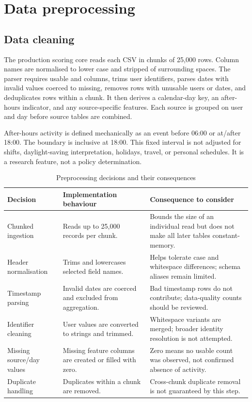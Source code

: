 \section{Data preprocessing}

\subsection{Data cleaning}
The production scoring core reads each CSV in chunks of 25,000 rows.
Column names are normalised to lower case and stripped of surrounding
spaces. The parser requires usable  and 
columns, trims user identifiers, parses dates with invalid values
coerced to missing, removes rows with unusable users or dates, and
deduplicates rows within a chunk. It then derives a calendar-day key,
an after-hours indicator, and any source-specific features. Each
source is grouped on user and day before source tables are combined.

After-hours activity is defined mechanically as an event before 06:00
or at/after 18:00. The boundary is inclusive at 18:00. This fixed
interval is not adjusted for shifts, daylight-saving interpretation,
holidays, travel, or personal schedules. It is a research feature, not
a policy determination.

\begin{table}[H]
\centering
\tablefont
\caption{Preprocessing decisions and their consequences}
\label{tab:preprocessing-decisions}
\begin{tabularx}{\textwidth}{|p{}|p{}|Y|}
\hline
\textbf{Decision} & \textbf{Implementation behaviour} & \textbf{Consequence to consider}\\\hline
Chunked ingestion & Reads up to 25,000 records per chunk. & Bounds the size of an individual read but does not make all later tables constant-memory.\\\hline
Header normalisation & Trims and lowercases selected field names. & Helps tolerate case and whitespace differences; schema aliases remain limited.\\\hline
Timestamp parsing & Invalid dates are coerced and excluded from aggregation. & Bad timestamp rows do not contribute; data-quality counts should be reviewed.\\\hline
Identifier cleaning & User values are converted to strings and trimmed. & Whitespace variants are merged; broader identity resolution is not attempted.\\\hline
Missing source/day values & Missing feature columns are created or filled with zero. & Zero means no usable count was observed, not confirmed absence of activity.\\\hline
Duplicate handling & Duplicates within a chunk are removed. & Cross-chunk duplicate removal is not guaranteed by this step.\\\hline
\end{tabularx}
\end{table}

